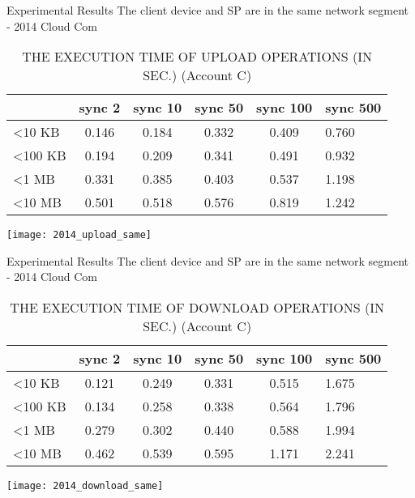 \begin{frame}{Experimental Results}
{The client device and SP are in the same network segment - 2014 Cloud Com}
	\scriptsize
    \begin{table}[]
    \centering
    \caption{THE EXECUTION TIME OF \alert{UPLOAD} OPERATIONS (IN SEC.) (Account C)}
    \begin{tabular}{lccccl}
                         & sync 2   & sync 10  & sync 50  & sync 100 & sync 500 \\ \hline
        \textless 10 KB  & 0.146 & 0.184 & 0.332 & 0.409 & 0.760  \\ \hline
        \textless 100 KB & 0.194 & 0.209 & 0.341 & 0.491 & 0.932  \\ \hline
        \textless 1 MB   & 0.331 & 0.385 & 0.403 & 0.537 & 1.198  \\ \hline
        \textless 10 MB  & 0.501 & 0.518 & 0.576 & 0.819 & 1.242  \\ \hline
    \end{tabular}
    \end{table}
    \begin{center}
		\texttt{[image: 2014\_upload\_same]}
    \end{center}
\end{frame}

\begin{frame}{Experimental Results}
{The client device and SP are in the same network segment - 2014 Cloud Com}
	\scriptsize
    \begin{table}[]
    \centering
    \caption{THE EXECUTION TIME OF \alert{DOWNLOAD} OPERATIONS (IN SEC.) (Account C)}
    \begin{tabular}{lccccl}
                         & sync 2   & sync 10  & sync 50  & sync 100 & sync 500  \\ \hline
        \textless 10 KB  & 0.121 & 0.249 & 0.331 & 0.515 & 1.675  \\ \hline
        \textless 100 KB & 0.134 & 0.258 & 0.338 & 0.564 & 1.796  \\ \hline
        \textless 1 MB   & 0.279 & 0.302 & 0.440 & 0.588 & 1.994  \\ \hline
        \textless 10 MB  & 0.462 & 0.539 & 0.595 & 1.171 & 2.241  \\ \hline
    \end{tabular}
    \end{table}
    \begin{center}
		\texttt{[image: 2014\_download\_same]}
    \end{center}
\end{frame}

